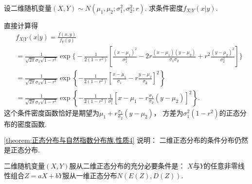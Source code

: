 \begin{example}\label{theorem:正态分布与自然指数分布族.性质4}
设二维随机变量\((X,Y) \sim N(\mu_1,\mu_2;\sigma_1^2,\sigma_2^2;r)\).
求条件密度\(f_{X \vert Y}(x \vert y)\).
\begin{solution}
\def\A{\frac{1}{\sqrt{2\pi}\sigma_1\sqrt{1-r^2}}}%
\def\B{\frac{1}{2(1-r^2)}}%
直接计算得\begin{align*}
	&f_{X \vert Y}(x \vert y) = \frac{f(x,y)}{f_Y(y)} \\
	&= \A
		\exp\Biggl\{
			- \B
			\left[
				\frac{(x-\mu_1)^2}{\sigma_1^2}
				- 2r\frac{(x-\mu_1)(y-\mu_2)}{\sigma_1\sigma_2}
				+ r^2\frac{(y-\mu_2)^2}{\sigma_2^2}
			\right]
		\Biggr\} \\
	&= \A
		\exp\left\{
			- \B
			\left[
				\frac{x-\mu_1}{\sigma_1}
				- r\frac{y-\mu_2}{\sigma_2}
			\right]^2
		\right\} \\
	&= \A
		\exp\left\{
			- \B
			\frac{1}{\sigma_1^2}
			\left[
				x - \mu_1
				- r\frac{\sigma_1}{\sigma_2}(y-\mu_2)
			\right]^2
		\right\}.
\end{align*}
这个条件密度函数恰好是期望为\(\mu_1+r\frac{\sigma_1}{\sigma_2}(y-\mu_2)\)，
方差为\(\sigma_1^2(1-r^2)\)的正态分布的密度函数.
\end{solution}
\end{example}
\begin{remark}
\cref{theorem:正态分布与自然指数分布族.性质4} 说明：
二维正态分布的条件分布仍然是正态分布.
\end{remark}

\begin{theorem}\label{theorem:正态分布与自然指数分布族.二维随机变量服从二维正态分布的充分必要条件}
二维随机变量\((X,Y)\)服从二维正态分布的充分必要条件是：
\(X\)与\(Y\)的任意非零线性组合\(Z = a X + b Y\)服从一维正态分布\(N(E(Z),D(Z))\).
\end{theorem}

